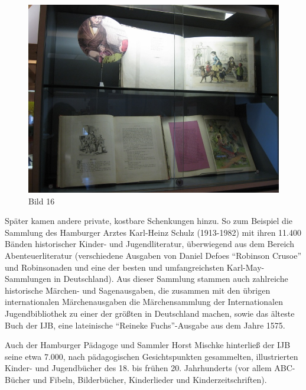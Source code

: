 \documentclass[a4paper,
fontsize=11pt,
oneside,
numbers=noperiodatend,
parskip=half-,
bibliography=totoc,
final
]{scrartcl}
\begin{document}
\begin{figure}[htbp]
\centering
\includegraphics{img/Bild16.jpg}
\caption{Bild 16}
\end{figure}

Später kamen andere private, kostbare Schenkungen hinzu. So zum Beispiel
die Sammlung des Hamburger Arztes Karl-Heinz Schulz (1913-1982) mit
ihren 11.400 Bänden historischer Kinder- und Jugendliteratur,
überwiegend aus dem Bereich Abenteuerliteratur (verschiedene Ausgaben
von Daniel Defoes \enquote{Robinson Crusoe} und Robinsonaden und eine
der besten und umfangreichsten Karl-May-Sammlungen in Deutschland). Aus
dieser Sammlung stammen auch zahlreiche historische Märchen- und
Sagenausgaben, die zusammen mit den übrigen internationalen
Märchenausgaben die Märchensammlung der Internationalen Jugendbibliothek
zu einer der größten in Deutschland machen, sowie das älteste Buch der
IJB, eine lateinische \enquote{Reineke Fuchs}-Ausgabe aus dem Jahre
1575.~

Auch der Hamburger Pädagoge und Sammler Horst Mischke hinterließ der IJB
seine etwa 7.000, nach pädagogischen Gesichtspunkten gesammelten,
illustrierten Kinder- und Jugendbücher des 18. bis frühen 20.
Jahrhunderts (vor allem ABC-Bücher und Fibeln, Bilderbücher,
Kinderlieder und Kinderzeitschriften).~
\end{document}
